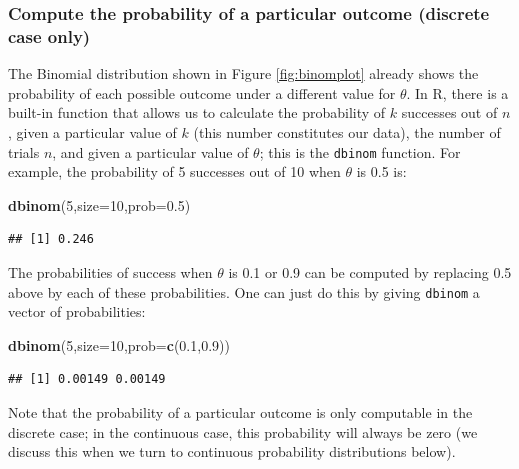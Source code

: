 \documentclass[12pt,]{krantz}
\newenvironment{Shaded}{\begin{snugshade}}{\end{snugshade}}
\newcommand{\DataTypeTok}[1]{\textcolor[rgb]{0.13,0.29,0.53}{#1}}
\newcommand{\DecValTok}[1]{\textcolor[rgb]{0.00,0.00,0.81}{#1}}
\newcommand{\FloatTok}[1]{\textcolor[rgb]{0.00,0.00,0.81}{#1}}
\newcommand{\KeywordTok}[1]{\textcolor[rgb]{0.13,0.29,0.53}{\textbf{#1}}}
\newcommand{\NormalTok}[1]{#1}
\theoremstyle{definition}
\theoremstyle{definition}
\theoremstyle{definition}
\theoremstyle{remark}
\begin{document}
\hypertarget{compute-the-probability-of-a-particular-outcome-discrete-case-only}{%
\subsubsection{Compute the probability of a particular outcome (discrete case only)}\label{compute-the-probability-of-a-particular-outcome-discrete-case-only}}

The Binomial distribution shown in Figure \ref{fig:binomplot} already shows the probability of each possible outcome under a different value for \(\theta\). In R, there is a built-in function that allows us to calculate the probability of \(k\) successes out of \(n\), given a particular value of \(k\) (this number constitutes our data), the number of trials \(n\), and given a particular value of \(\theta\); this is the \texttt{dbinom} function. For example, the probability of 5 successes out of 10 when \(\theta\) is 0.5 is:

\begin{Shaded}
\begin{Highlighting}[]
\KeywordTok{dbinom}\NormalTok{(}\DecValTok{5}\NormalTok{,}\DataTypeTok{size=}\DecValTok{10}\NormalTok{,}\DataTypeTok{prob=}\FloatTok{0.5}\NormalTok{)}
\end{Highlighting}
\end{Shaded}

\begin{verbatim}
## [1] 0.246
\end{verbatim}

The probabilities of success when \(\theta\) is 0.1 or 0.9 can be computed by replacing 0.5 above by each of these probabilities. One can just do this by giving \texttt{dbinom} a vector of probabilities:

\begin{Shaded}
\begin{Highlighting}[]
\KeywordTok{dbinom}\NormalTok{(}\DecValTok{5}\NormalTok{,}\DataTypeTok{size=}\DecValTok{10}\NormalTok{,}\DataTypeTok{prob=}\KeywordTok{c}\NormalTok{(}\FloatTok{0.1}\NormalTok{,}\FloatTok{0.9}\NormalTok{))}
\end{Highlighting}
\end{Shaded}

\begin{verbatim}
## [1] 0.00149 0.00149
\end{verbatim}

Note that the probability of a particular outcome is only computable in the discrete case; in the continuous case, this probability will always be zero (we discuss this when we turn to continuous probability distributions below).
\end{document}
